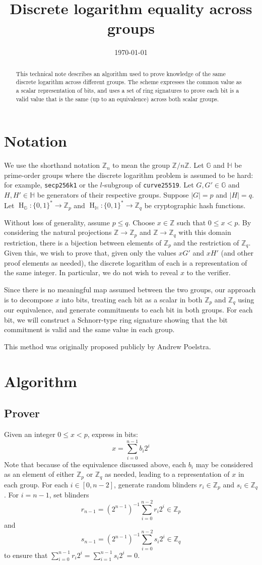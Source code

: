 \documentclass{mrl}
\title{Discrete logarithm equality across groups}
\date{\today}
\newcommand{\hg}{\operatorname{H}_\mathbb{G}}
\newcommand{\hh}{\operatorname{H}_\mathbb{H}}
\newcommand{\zp}{\mathbb{Z}_p}
\newcommand{\zq}{\mathbb{Z}_q}
\begin{document}
\begin{abstract}
This technical note describes an algorithm used to prove knowledge of the same discrete logarithm across different groups. The scheme expresses the common value as a scalar representation of bits, and uses a set of ring signatures to prove each bit is a valid value that is the same (up to an equivalence) across both scalar groups. 
\end{abstract}

\section{Notation}
We use the shorthand notation $\mathbb{Z}_n$ to mean the group $\mathbb{Z}/n\mathbb{Z}$. Let $\mathbb{G}$ and $\mathbb{H}$ be prime-order groups where the discrete logarithm problem is assumed to be hard: for example, \texttt{secp256k1} or the $l$-subgroup of \texttt{curve25519}. Let $G,G' \in \mathbb{G}$ and $H,H' \in \mathbb{H}$ be generators of their respective groups. Suppose $|G| = p$ and $|H| = q$. Let $\hg: \{0,1\}^* \to \zp$ and $\hh: \{0,1\}^* \to \zq$ be cryptographic hash functions.

Without loss of generality, assume $p \leq q$. Choose $x \in \mathbb{Z}$ such that $0 \leq x < p$. By considering the natural projections $\mathbb{Z} \to \zp$ and $\mathbb{Z} \to \zq$ with this domain restriction, there is a bijection between elements of $\zp$ and the restriction of $\zq$. Given this, we wish to prove that, given only the values $xG'$ and $xH'$ (and other proof elements as needed), the discrete logarithm of each is a representation of the same integer. In particular, we do not wish to reveal $x$ to the verifier.

Since there is no meaningful map assumed between the two groups, our approach is to decompose $x$ into bits, treating each bit as a scalar in both $\zp$ and $\zq$ using our equivalence, and generate commitments to each bit in both groups. For each bit, we will construct a Schnorr-type ring signature showing that the bit commitment is valid and the same value in each group.

This method was originally proposed publicly by Andrew Poelstra.
\section{Algorithm}
\subsection{Prover}
Given an integer $0 \leq x < p$, express in bits: $$x = \sum_{i=0}^{n-1} b_i2^i$$ Note that because of the equivalence discussed above, each $b_i$ may be considered as an element of either $\zp$ or $\zq$ as needed, leading to a representation of $x$ in each group.
For each $i \in [0,n-2]$, generate random blinders $r_i \in \zp$ and $s_i \in \zq$. For $i = n-1$, set blinders $$r_{n-1} = (2^{n-1})^{-1}\sum_{i=0}^{n-2} r_i2^i \in \zp$$ and $$s_{n-1} = (2^{n-1})^{-1}\sum_{i=0}^{n-2} s_i2^i \in \zq$$ to ensure that $\sum_{i=0}^{n-1} r_i2^i = \sum_{i=1}^{n-1} s_i2^i = 0$.
\end{document}
